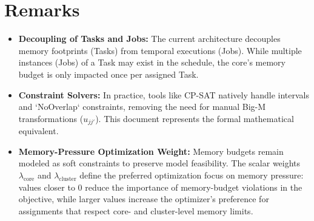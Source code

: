 \documentclass[11pt,a4paper]{article}
\begin{document}
\section{Remarks}

\begin{itemize}
    \item \textbf{Decoupling of Tasks and Jobs:} The current architecture decouples memory footprints (Tasks) from temporal executions (Jobs). While multiple instances (Jobs) of a Task may exist in the schedule, the core's memory budget is only impacted once per assigned Task.
    \item \textbf{Constraint Solvers:} In practice, tools like CP-SAT natively handle intervals and `NoOverlap` constraints, removing the need for manual Big-M transformations ($u_{jj'}$). This document represents the formal mathematical equivalent.
    \item \textbf{Memory-Pressure Optimization Weight:} Memory budgets remain modeled as soft constraints to preserve model feasibility. The scalar weights $\lambda_{\mathrm{core}}$ and $\lambda_{\mathrm{cluster}}$ define the preferred optimization focus on memory pressure: values closer to $0$ reduce the importance of memory-budget violations in the objective, while larger values increase the optimizer's preference for assignments that respect core- and cluster-level memory limits.
\end{itemize}
\end{document}
